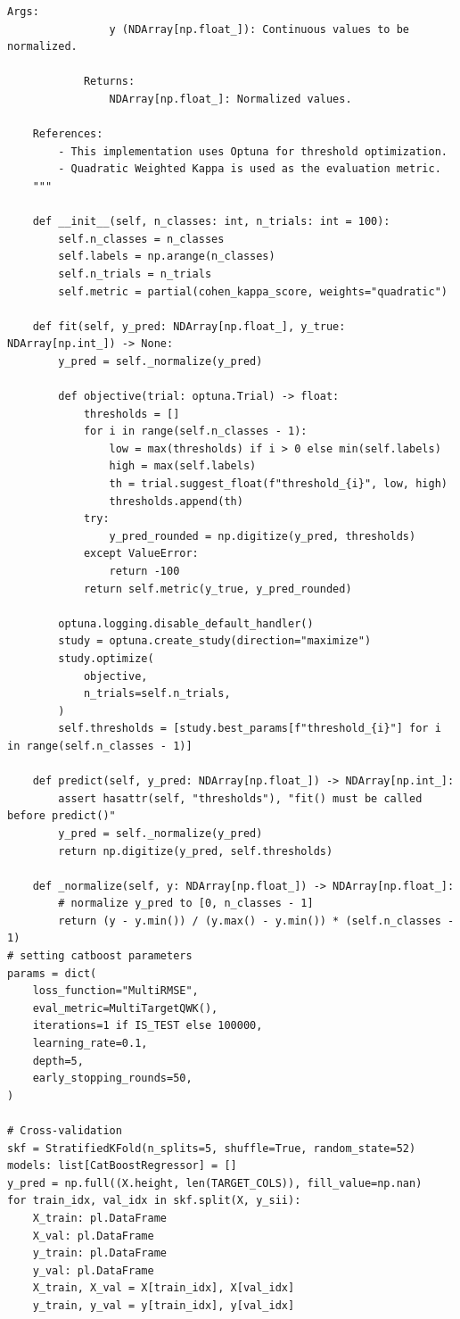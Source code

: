 \documentclass[12pt]{extarticle}
\begin{document}
\begin{mdframed}
\begin{lstlisting}[breaklines=true]
            Args:
                y (NDArray[np.float_]): Continuous values to be normalized.

            Returns:
                NDArray[np.float_]: Normalized values.

    References:
        - This implementation uses Optuna for threshold optimization.
        - Quadratic Weighted Kappa is used as the evaluation metric.
    """

    def __init__(self, n_classes: int, n_trials: int = 100):
        self.n_classes = n_classes
        self.labels = np.arange(n_classes)
        self.n_trials = n_trials
        self.metric = partial(cohen_kappa_score, weights="quadratic")

    def fit(self, y_pred: NDArray[np.float_], y_true: NDArray[np.int_]) -> None:
        y_pred = self._normalize(y_pred)

        def objective(trial: optuna.Trial) -> float:
            thresholds = []
            for i in range(self.n_classes - 1):
                low = max(thresholds) if i > 0 else min(self.labels)
                high = max(self.labels)
                th = trial.suggest_float(f"threshold_{i}", low, high)
                thresholds.append(th)
            try:
                y_pred_rounded = np.digitize(y_pred, thresholds)
            except ValueError:
                return -100
            return self.metric(y_true, y_pred_rounded)

        optuna.logging.disable_default_handler()
        study = optuna.create_study(direction="maximize")
        study.optimize(
            objective,
            n_trials=self.n_trials,
        )
        self.thresholds = [study.best_params[f"threshold_{i}"] for i in range(self.n_classes - 1)]

    def predict(self, y_pred: NDArray[np.float_]) -> NDArray[np.int_]:
        assert hasattr(self, "thresholds"), "fit() must be called before predict()"
        y_pred = self._normalize(y_pred)
        return np.digitize(y_pred, self.thresholds)

    def _normalize(self, y: NDArray[np.float_]) -> NDArray[np.float_]:
        # normalize y_pred to [0, n_classes - 1]
        return (y - y.min()) / (y.max() - y.min()) * (self.n_classes - 1)
# setting catboost parameters
params = dict(
    loss_function="MultiRMSE",
    eval_metric=MultiTargetQWK(),
    iterations=1 if IS_TEST else 100000,
    learning_rate=0.1,
    depth=5,
    early_stopping_rounds=50,
)

# Cross-validation
skf = StratifiedKFold(n_splits=5, shuffle=True, random_state=52)
models: list[CatBoostRegressor] = []
y_pred = np.full((X.height, len(TARGET_COLS)), fill_value=np.nan)
for train_idx, val_idx in skf.split(X, y_sii):
    X_train: pl.DataFrame
    X_val: pl.DataFrame
    y_train: pl.DataFrame
    y_val: pl.DataFrame
    X_train, X_val = X[train_idx], X[val_idx]
    y_train, y_val = y[train_idx], y[val_idx]


\end{lstlisting}
\end{mdframed}
\end{document}
